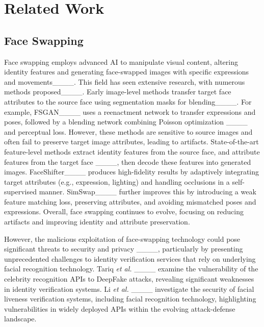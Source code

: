 \section{Related Work}

\subsection{Face Swapping}
Face swapping employs advanced AI to manipulate visual content, altering identity features and generating face-swapped images with specific expressions and movements____. This field has seen extensive research, with numerous methods proposed____. Early image-level methods transfer target face attributes to the source face using segmentation masks for blending____. For example, FSGAN____ uses a reenactment network to transfer expressions and poses, followed by a blending network combining Poisson optimization ____ and perceptual loss. However, these methods are sensitive to source images and often fail to preserve target image attributes, leading to artifacts. 
State-of-the-art feature-level methods extract identity features from the source face, and attribute features from the target face ____, then decode these features into generated images. FaceShifter____ produces high-fidelity results by adaptively integrating target attributes (e.g., expression, lighting) and handling occlusions in a self-supervised manner. SimSwap____ further improves this by introducing a weak feature matching loss, preserving attributes, and avoiding mismatched poses and expressions. Overall, face swapping continues to evolve, focusing on reducing artifacts and improving identity and attribute preservation.

However, the malicious exploitation of face-swapping technology could pose significant threats to security and privacy ____, particularly by presenting unprecedented challenges to identity verification services that rely on underlying facial recognition technology.
Tariq \textit{et al.} ____ examine the vulnerability of the celebrity recognition APIs to DeepFake attacks, revealing significant weaknesses in identity verification systems.
Li \textit{et al.} ____ investigate the security of facial liveness verification systems, including facial recognition technology, highlighting vulnerabilities in widely deployed APIs within the evolving attack-defense landscape.

